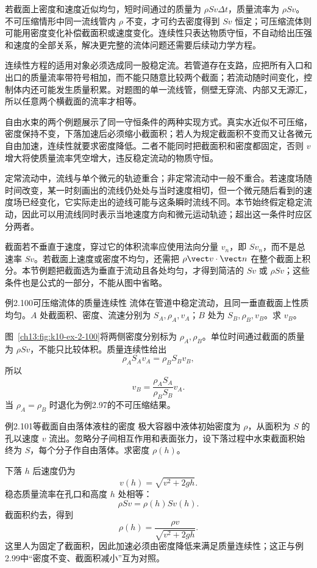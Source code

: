 若截面上密度和速度近似均匀，短时间通过的质量为 $\rho Sv\Delta t$，质量流率为 $\rho Sv$。不可压缩情形中同一流线管内 $\rho$ 不变，才可约去密度得到 $Sv$ 恒定；可压缩流体则可能用密度变化补偿截面积或速度变化。连续性只表达物质守恒，不自动给出压强和速度的全部关系，解决更完整的流体问题还需要后续动力学方程。

连续性方程的适用对象必须选成同一股稳定流。若管道存在支路，应把所有入口和出口的质量流率带符号相加，而不能只随意比较两个截面；若流动随时间变化，控制体内还可能发生质量积累。对题图的单一流线管，侧壁无穿流、内部又无源汇，所以任意两个横截面的流率才相等。

自由水束的两个例题展示了同一守恒条件的两种实现方式。真实水近似不可压缩，密度保持不变，下落加速后必须缩小截面积；若人为规定截面积不变而又让各微元自由加速，连续性就要求密度降低。二者不能同时把截面积和密度都固定，否则 $v$ 增大将使质量流率凭空增大，违反稳定流动的物质守恒。

定常流动中，流线与单个微元的轨迹重合；非定常流动中一般不重合。若速度场随时间改变，某一时刻画出的流线仍处处与当时速度相切，但一个微元随后看到的速度场已经变化，它实际走出的迹线可能与这条瞬时流线不同。本节始终假定稳定流动，因此可以用流线同时表示当地速度方向和微元运动轨迹；超出这一条件时应区分两者。

截面若不垂直于速度，穿过它的体积流率应使用法向分量 $v_n$，即 $Sv_n$，而不是总速率 $Sv$。若截面上速度或密度不均匀，还需把 $\rho\vect v\cdot\vect n$ 在整个截面上积分。本节例题把截面选为垂直于流动且各处均匀，才得到简洁的 $Sv$ 或 $\rho Sv$；这些条件也是公式的一部分，不能从图中省略。

\begin{origexamplebox}{例2.100\quad 可压缩流体的质量连续性}
流体在管道中稳定流动，且同一垂直截面上性质均匀。$A$ 处截面积、密度、流速分别为 $S_A,\rho_A,v_A$；$B$ 处为 $S_B,\rho_B,v_B$。求 $v_B$。

\CompressiblePipeDiagram
\end{origexamplebox}
\begin{xesolution}
图~\ref{ch13:fig:k10-ex-2-100}将两侧密度分别标为 $\rho_A,\rho_B$。单位时间通过截面的质量为 $\rho Sv$，不能只比较体积。质量连续性给出
\[
\rho_AS_Av_A=\rho_BS_Bv_B,
\]
所以
\[
\boxed{v_B=\frac{\rho_AS_A}{\rho_BS_B}v_A}.
\]
当 $\rho_A=\rho_B$ 时退化为例2.97的不可压缩结果。
\end{xesolution}

\begin{origexamplebox}{例2.101\quad 等截面自由落体液柱的密度}
极大容器中液体初始密度为 $\rho$，从面积为 $S$ 的孔以速度 $v$ 流出。忽略分子间相互作用和表面张力，设下落过程中水束截面积始终为 $S$，每个分子作自由落体。求密度 $\rho(h)$。
\end{origexamplebox}
\begin{xesolution}
下落 $h$ 后速度仍为
\[
v(h)=\sqrt{v^2+2gh}.
\]
稳态质量流率在孔口和高度 $h$ 处相等：
\[
\rho Sv=\rho(h)S v(h).
\]
截面积约去，得到
\[
\boxed{\rho(h)=\frac{\rho v}{\sqrt{v^2+2gh}}}.
\]
这里人为固定了截面积，因此加速必须由密度降低来满足质量连续性；这正与例2.99中“密度不变、截面积减小”互为对照。
\end{xesolution}
